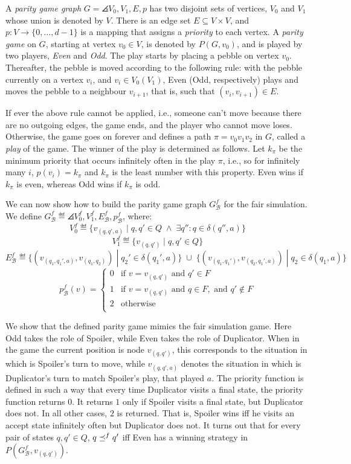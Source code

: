A \emph{parity game graph} $G = \angles{V_0,V_1,E,p}$ has two disjoint sets of
vertices, $V_0$ and $V_1$ whose union is denoted by $V$.
There is an edge set $E \subseteq V \times V$, and $p: V \rightarrow \{0, \dots, d-1\}$
is a mapping that assigns a \emph{priority} to each vertex.
A \emph{parity game} on $G$, starting at vertex $v_0 \in V$, is denoted by $P(G,v_0)$,
and is played by two players, \emph{Even} and \emph{Odd}.
The play starts by placing a pebble on vertex $v_0$.
Thereafter, the pebble is moved according to the following rule: with the pebble
currently on a vertex $v_i$, and $v_i \in V_0 (V_1)$, Even (Odd, respectively)
plays and moves the pebble to a neighbour $v_{i+1}$, that is, such that
$(v_i,v_{i+1} ) \in E$.

If ever the above rule cannot be applied, i.e., someone can't move because there are
no outgoing edges, the game ends, and the player who cannot move loses.
Otherwise, the game goes on forever and defines a path
$\pi = v_0 v_1 v_2$ in $G$, called a \emph{play} of the game.
The winner of the play is determined as follows.
Let $k_{\pi}$ be the minimum priority that occurs infinitely often in the play $\pi$,
i.e., so for infinitely many $i$, $p(v_i)= k_{\pi}$ and $k_{\pi}$ is the least
number with this property.
Even wins if $k_{\pi}$ is even, whereas Odd wins if $k_{\pi}$ is odd.

We can now show how to build the parity game graph $G_{\mathcal{B}}^f$ for the
fair simulation.
We define $G_{\mathcal{B}}^f \eqdef \angles{V_0^f, V_1^f, E_{\mathcal{B}}^f, p_{\mathcal{B}}^f}$, where:
\[V_0^f  \eqdef \{ v_{(q,q',a)} \;|\; q,q' \in Q \; \wedge \;
\exists q'': q \in \delta(q'',a) \} \]
\[ V_1^f  \eqdef \{ v_{(q,q')} \;|\; q,q' \in Q \} \]
\[E_{\mathcal{B}}^f  \eqdef \{(v_{(q_1,q_1',a)}, v_{(q_1,q_2)})
\;|\; q_2' \in \delta(q_1',a)\} \; \cup \;
\{(v_{(q_1,q_1')}, v_{(q_2,q_1',a)}) \;|\; q_2 \in \delta(q_1,a)\} \]
\[p_{\mathcal{B}}^f(v) =
\begin{cases}
0 &\mbox{if } v = v_{(q,q')} \mbox{ and } q' \in F\\
1 &\mbox{if } v = v_{(q,q')} \mbox{ and } q \in F, \mbox{ and } q' \notin F\\
2 &\mbox{otherwise}\\
\end{cases}\]

We show that the defined parity game mimics the fair simulation game.
Here Odd takes the role of Spoiler, while Even takes the role of Duplicator.
When in the game the current position is node $v_{(q,q')}$, this corresponds
to the situation in which is Spoiler's turn to move, while $v_{(q,q',a)}$
denotes the situation in which is Duplicator's turn to match Spoiler's
play, that played $a$.
The priority function is defined in such a way that every
time Duplicator visits a final state, the priority function returns $0$.
It returns $1$ only if Spoiler visits a final state, but Duplicator does not.
In all other cases, $2$ is returned.
That is, Spoiler wins iff he visits an accept state infinitely often but
Duplicator does not.
It turns out that for every pair of states $q,q' \in Q$, $q \preceq^{f} q'$
iff Even has a winning strategy in $P(G_{\mathcal{B}}^f, v_{(q,q')})$.

